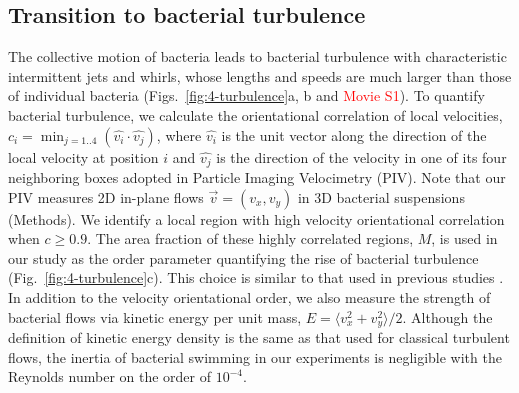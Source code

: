 \subsection{Transition to bacterial turbulence}
The collective motion of bacteria leads to bacterial turbulence with characteristic intermittent jets and whirls, whose lengths and speeds are much larger than those of individual bacteria (Figs.~\ref{fig:4-turbulence}a, b and \textcolor{red}{Movie S1}). To quantify bacterial turbulence, we calculate the orientational correlation of local velocities, $c_i=\min_{j=1..4}(\hat{v_i}\cdot\hat{v_j})$, where $\hat{v_i}$ is the unit vector along the direction of the local velocity at position $i$ and $\hat{v_j}$ is the direction of the velocity in one of its four neighboring boxes adopted in Particle Imaging Velocimetry (PIV).
Note that our PIV measures 2D in-plane flows $\vec{v}=(v_x, v_y)$ in 3D bacterial suspensions (Methods). We identify a local region with high velocity orientational correlation when $c \ge 0.9$. The area fraction of these highly correlated regions, $M$, is used in our study as the order parameter quantifying the rise of bacterial turbulence (Fig.~\ref{fig:4-turbulence}c). This choice is similar to that used in previous studies \cite{Cisneros2011}. In addition to the velocity orientational order, we also measure the strength of bacterial flows via kinetic energy per unit mass, $E=\langle v_x^2 + v_y^2 \rangle / 2$.
Although the definition of kinetic energy density is the same as that used for classical turbulent flows, the inertia of bacterial swimming in our experiments is negligible with the Reynolds number on the order of $10^{-4}$.

